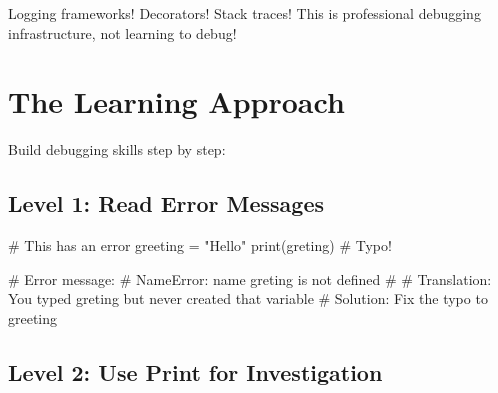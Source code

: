 \documentclass[
  letterpaper,
  DIV=11,
  numbers=noendperiod,
  oneside]{scrreprt}
\newenvironment{Shaded}{}{}
\newcommand{\BuiltInTok}[1]{\textcolor[rgb]{0.84,0.23,0.29}{#1}}
\newcommand{\CommentTok}[1]{\textcolor[rgb]{0.42,0.45,0.49}{#1}}
\newcommand{\NormalTok}[1]{\textcolor[rgb]{0.14,0.16,0.18}{#1}}
\newcommand{\OperatorTok}[1]{\textcolor[rgb]{0.14,0.16,0.18}{#1}}
\newcommand{\StringTok}[1]{\textcolor[rgb]{0.01,0.18,0.38}{#1}}
\begin{document}
Logging frameworks! Decorators! Stack traces! This is professional
debugging infrastructure, not learning to debug!

\section{The Learning Approach}\label{the-learning-approach-8}

Build debugging skills step by step:

\subsection{Level 1: Read Error
Messages}\label{level-1-read-error-messages}

\begin{Shaded}
\begin{Highlighting}[]
\CommentTok{\# This has an error}
\NormalTok{greeting }\OperatorTok{=} \StringTok{"Hello"}
\BuiltInTok{print}\NormalTok{(greting)  }\CommentTok{\# Typo!}

\CommentTok{\# Error message:}
\CommentTok{\# NameError: name \textquotesingle{}greting\textquotesingle{} is not defined}
\CommentTok{\# }
\CommentTok{\# Translation: You typed \textquotesingle{}greting\textquotesingle{} but never created that variable}
\CommentTok{\# Solution: Fix the typo to \textquotesingle{}greeting\textquotesingle{}}
\end{Highlighting}
\end{Shaded}

\subsection{Level 2: Use Print for
Investigation}\label{level-2-use-print-for-investigation}
\end{document}
